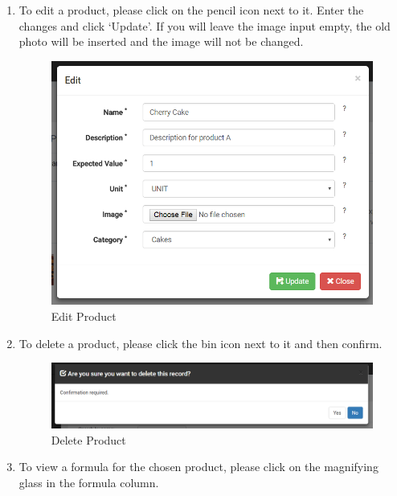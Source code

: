 \documentclass[a4paper,11pt,twoside]{report}
\theoremstyle{definition}
\begin{document}
\begin{enumerate}
\item To edit a product, please click on the pencil icon next to it. Enter the changes and click ‘Update’. If you will leave the image input empty, the old photo will be inserted and the image will not be changed.

\begin{figure}[h!]
\begin{center}
\includegraphics[width=\textwidth]{AS/product/6}
\end{center}
\caption{Edit Product}
\end{figure}
\thispagestyle{empty}

\item To delete a product, please click the bin icon next to it and then confirm.


\begin{figure}[h!]
\begin{center}
\includegraphics[width=\textwidth]{AS/product/7}
\end{center}
\caption{Delete Product}
\end{figure}
\thispagestyle{empty}

\item To view a formula for the chosen product, please click on the magnifying glass in the formula column.


\end{enumerate}
\end{document}
